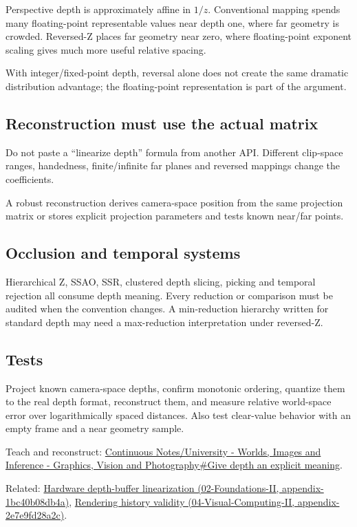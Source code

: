 Perspective depth is approximately affine in \(1/z\). Conventional mapping spends many floating-point representable values near depth one, where far geometry is crowded. Reversed-Z places far geometry near zero, where floating-point exponent scaling gives much more useful relative spacing.

With integer/fixed-point depth, reversal alone does not create the same dramatic distribution advantage; the floating-point representation is part of the argument.

\subsection{Reconstruction must use the actual matrix}\label{reconstruction-must-use-the-actual-matrix}

Do not paste a ``linearize depth'' formula from another API. Different clip-space ranges, handedness, finite/infinite far planes and reversed mappings change the coefficients.

A robust reconstruction derives camera-space position from the same projection matrix or stores explicit projection parameters and tests known near/far points.

\subsection{Occlusion and temporal systems}\label{occlusion-and-temporal-systems}

Hierarchical Z, SSAO, SSR, clustered depth slicing, picking and temporal rejection all consume depth meaning. Every reduction or comparison must be audited when the convention changes. A min-reduction hierarchy written for standard depth may need a max-reduction interpretation under reversed-Z.

\subsection{Tests}\label{tests}

Project known camera-space depths, confirm monotonic ordering, quantize them to the real depth format, reconstruct them, and measure relative world-space error over logarithmically spaced distances. Also test clear-value behavior with an empty frame and a near geometry sample.

Teach and reconstruct: \href{Continuous\%20Notes/University\%20-\%20Worlds,\%20Images\%20and\%20Inference\%20-\%20Graphics,\%20Vision\%20and\%20Photography\#Give\%20depth\%20an\%20explicit\%20meaning}{Continuous Notes/University - Worlds, Images and Inference - Graphics, Vision and Photography\#Give depth an explicit meaning}.

Related: \href{}{Hardware depth-buffer linearization (02-Foundations-II, appendix-1bc40b08db4a)}, \href{}{Rendering history validity (04-Visual-Computing-II, appendix-2e7e9fd28a2c)}.
